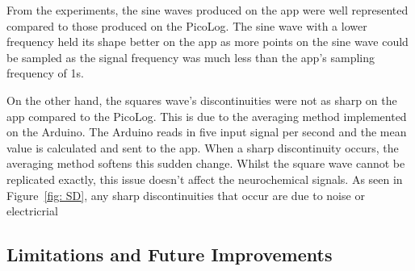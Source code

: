 

From the experiments, the sine waves produced on the app were well represented compared to those produced on the PicoLog. The sine wave with a lower frequency held its shape better on the app as more points on the sine wave could be sampled as the signal frequency was much less than the app's sampling frequency of 1s. 

On the other hand, the squares wave's discontinuities were not as sharp on the app compared to the PicoLog. This is due to the averaging method implemented on the Arduino. The Arduino reads in five input signal per second and the mean value is calculated and sent to the app. When a sharp discontinuity occurs, the averaging method softens this sudden change. Whilst the square wave cannot be replicated exactly, this issue doesn't affect the neurochemical signals. As seen in Figure~\ref{fig: SD}, any sharp discontinuities that occur are due to noise or electricrial 

\subsection{Limitations and Future Improvements}

